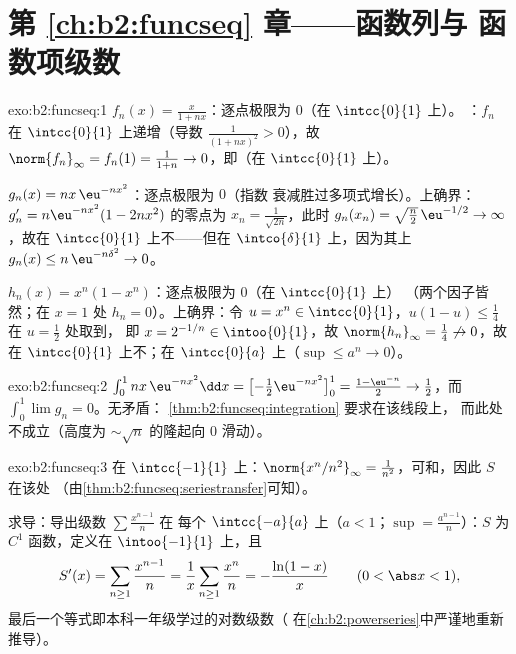 \section*{第 \ref{ch:b2:funcseq} 章——函数列与
函数项级数}

\begin{solution}{exo:b2:funcseq:1}
$f_n(x) = \frac{x}{1 + nx}$：逐点极限为 $0$（在 $\intcc{0}{1}$ 上）。
：$f_n$ 在 $\intcc{0}{1}$ 上递增（导数
$\frac{1}{(1+nx)^2} > 0$），故 $\norm{f_n}_\infty = f_n(1) =
\frac{1}{1+n} \to 0$，即\emph{}（在 $\intcc{0}{1}$ 上）。

$g_n(x) = nx\,\eu^{-nx^2}$：逐点极限为 $0$（指数
衰减胜过多项式增长）。上确界：$g_n' = n\eu^{-nx^2}(1 - 2nx^2)$ 的零点为 $x_n =
\frac{1}{\sqrt{2n}}$，此时 $g_n(x_n) = \sqrt{\frac n2}\,\eu^{-1/2}
\to \infty$，故在 $\intcc{0}{1}$ 上不——但在
$\intco{\delta}{1}$ 上，因为其上 $g_n(x) \leq n\,\eu^{-n\delta^2}
\to 0$。

$h_n(x) = x^n(1 - x^n)$：逐点极限为 $0$（在 $\intcc{0}{1}$ 上）
（两个因子皆然；在 $x = 1$ 处 $h_n = 0$）。上确界：令 $u = x^n \in
\intcc{0}{1}$，$u(1-u) \leq \frac14$ 在 $u = \frac12$ 处取到，
即 $x = 2^{-1/n} \in \intoo{0}{1}$，故 $\norm{h_n}_\infty =
\frac14 \not\to 0$，故在 $\intcc{0}{1}$ 上不；在
$\intcc{0}{a}$ 上（$\sup \leq a^n \to 0$）。
\end{solution}

\begin{solution}{exo:b2:funcseq:2}
$\int_0^1 nx\,\eu^{-nx^2}\dd x = \bigl[-\tfrac12
\eu^{-nx^2}\bigr]_0^1 = \frac{1 - \eu^{-n}}{2} \to \frac12$，而
$\int_0^1 \lim g_n = 0$。无矛盾：
\cref{thm:b2:funcseq:integration} 要求在该线段上\emph{}，
而此处不成立（高度为
$\sim\sqrt n$ 的隆起向 $0$ 滑动）。
\end{solution}

\begin{solution}{exo:b2:funcseq:3}
在 $\intcc{-1}{1}$ 上：$\norm{x^n/n^2}_\infty =
\frac{1}{n^2}$，可和，因此 $S$ 在该处
（由\cref{thm:b2:funcseq:seriestransfer}可知）。

求导：导出级数 $\sum \frac{x^{n-1}}{n}$ 在
每个 $\intcc{-a}{a}$ 上（$a < 1$；$\sup =
\frac{a^{n-1}}{n}$）：$S$ 为 $C^1$ 函数，定义在 $\intoo{-1}{1}$ 上，且
\[
S'(x) = \sum_{n\geq1} \frac{x^{n-1}}{n} = \frac1x \sum_{n\geq1}
\frac{x^n}{n} = -\frac{\ln(1 - x)}{x}
\qquad (0 < \abs x < 1),
\]
最后一个等式即本科一年级学过的对数级数（
在\cref{ch:b2:powerseries}中严谨地重新推导）。
\end{solution}

